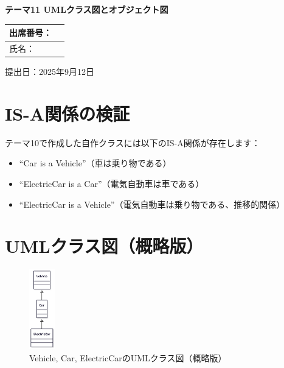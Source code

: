 \documentclass[a4paper]{article}
\begin{document}
\begin{CJK}{UTF8}{min}

\begin{titlepage}
\begin{center}
\vspace*{30mm}
{\LARGE \textbf{テーマ11 UMLクラス図とオブジェクト図}}
\vspace{20mm}

\begin{table}[h]
\centering
\large
\begin{tabular}{ll}
出席番号： & \\
\hline
氏名： & \\
\hline
\end{tabular}
\end{table}

\vfill

{\large 提出日：2025年9月12日}
\end{center}
\end{titlepage}

\section{IS-A関係の検証}

テーマ10で作成した自作クラスには以下のIS-A関係が存在します：

\begin{itemize}
\item ``Car is a Vehicle''（車は乗り物である）
\item ``ElectricCar is a Car''（電気自動車は車である）
\item ``ElectricCar is a Vehicle''（電気自動車は乗り物である、推移的関係）
\end{itemize}

\newpage

\section{UMLクラス図（概略版）}

\begin{figure}[h]
\centering
\includegraphics[width=0.1\textwidth]{a.png}
\caption{Vehicle, Car, ElectricCarのUMLクラス図（概略版）}
\end{figure}


\end{CJK}
\end{document}
